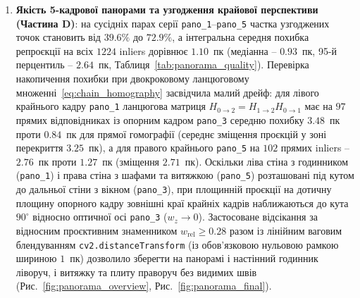 \documentclass[14pt, a4paper]{extarticle}
\begin{document}
\begin{enumerate}
    \item \textbf{Якість 5-кадрової панорами та узгодження крайової перспективи (Частина D)}: на сусідніх парах серії \texttt{pano\_1}--\texttt{pano\_5} частка узгоджених точок становить від $39.6\%$ до $72.9\%$, а інтегральна середня похибка репроєкції на всіх $1224$ inliers дорівнює $\mathbf{1.10}$~пк (медіанна -- $0.93$~пк, 95-й перцентиль -- $2.64$~пк, Таблиця~\ref{tab:panorama_quality}). Перевірка накопичення похибки при двокроковому ланцюговому множенні~\eqref{eq:chain_homography} засвідчила малий дрейф: для лівого крайнього кадру \texttt{pano\_1} ланцюгова матриця $H_{0 \to 2} = H_{1 \to 2} H_{0 \to 1}$ має на $97$ прямих відповідниках із опорним кадром \texttt{pano\_3} середню похибку $3.48$~пк проти $0.84$~пк для прямої гомографії (середнє зміщення проєкцій у зоні перекриття $3.25$~пк), а для правого крайнього \texttt{pano\_5} на $102$ прямих inliers -- $2.76$~пк проти $1.27$~пк (зміщення $2.71$~пк). Оскільки ліва стіна з годинником (\texttt{pano\_1}) і права стіна з шафами та витяжкою (\texttt{pano\_5}) розташовані під кутом до дальньої стіни з вікном (\texttt{pano\_3}), при площинній проєкції на дотичну площину опорного кадру зовнішні краї крайніх кадрів наближаються до кута $90^\circ$ відносно оптичної осі \texttt{pano\_3} ($w_z \to 0$). Застосоване відсікання за відносним проєктивним знаменником $w_{\text{rel}} \ge 0.28$ разом із лінійним ваговим блендуванням \texttt{cv2.distanceTransform} (із обов'язковою нульовою рамкою шириною $1$~пк) дозволило зберегти на панорамі і настінний годинник ліворуч, і витяжку та плиту праворуч без видимих швів (Рис.~\ref{fig:panorama_overview}, Рис.~\ref{fig:panorama_final}).


\end{enumerate}
\end{document}
